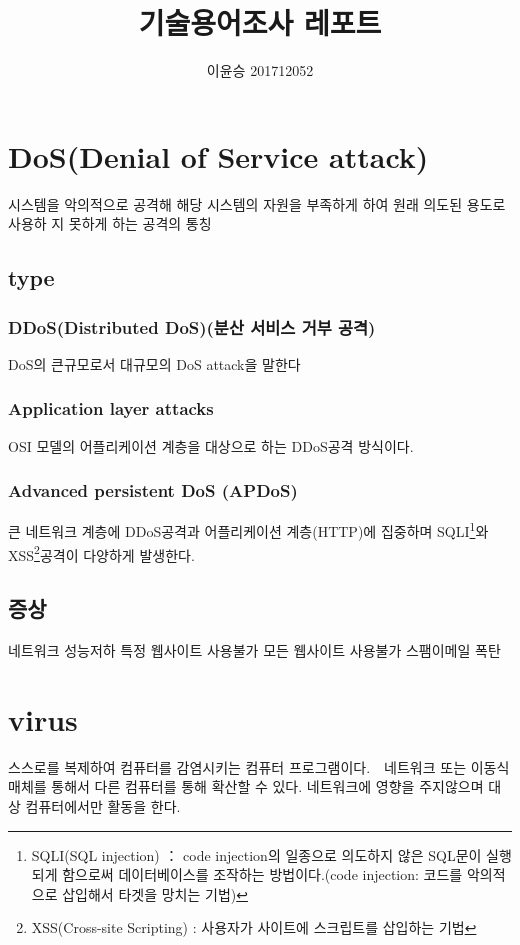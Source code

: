 \documentclass{oblivoir}
\begin{document}
\title{기술용어조사 레포트}
\author{이윤승 201712052}
\maketitle
\section{DoS(Denial of Service attack)}
시스템을 악의적으로 공격해 해당 시스템의 자원을 부족하게 하여 원래 의도된 용도로 사용하 지 못하게 하는 공격의 통칭
\subsection{type}
\subsubsection{DDoS(Distributed DoS)(분산 서비스 거부 공격)}
DoS의 큰규모로서 대규모의 DoS attack을 말한다
\subsubsection{Application layer attacks}
OSI 모델의 어플리케이션 계층을 대상으로 하는 DDoS공격 방식이다.

\subsubsection{Advanced persistent DoS (APDoS)}큰 네트워크 계층에 DDoS공격과 어플리케이션 계층(HTTP)에 집중하며 SQLI\footnote{SQLI(SQL injection) ： code injection의 일종으로 의도하지 않은 SQL문이 실행되게 함으로써 데이터베이스를 조작하는 방법이다.(code injection: 코드를 악의적으로 삽입해서 타겟을 망치는 기법)}와  XSS\footnote{XSS(Cross-site Scripting) : 사용자가 사이트에 스크립트를 삽입하는 기법}공격이 다양하게 발생한다.

\subsection{증상}
네트워크 성능저하\newline
특정 웹사이트 사용불가\newline
모든 웹사이트 사용불가\newline
스팸이메일 폭탄

\section{virus}
스스로를 복제하여 컴퓨터를 감염시키는 컴퓨터 프로그램이다.　네트워크 또는 이동식 매체를 통해서 다른 컴퓨터를 통해 확산할 수 있다. 네트워크에 영향을 주지않으며 대상 컴퓨터에서만 활동을 한다.
\end{document}
